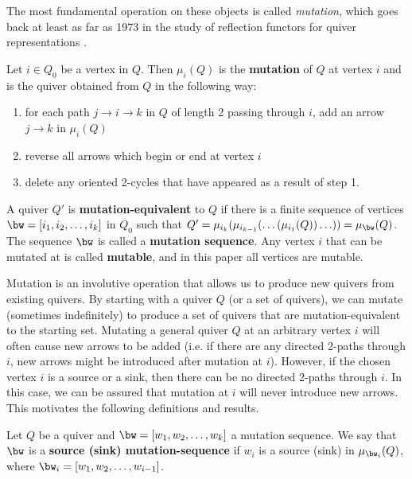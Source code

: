 The most fundamental operation on these objects is called \textit{mutation}, which goes back at least as far as 1973 in the study of reflection functors for quiver representations \cite{MR0393065}.

\begin{defi}\label{def-mutation}
    Let $i \in Q_0$ be a vertex in $Q$. 
    Then $\mu_i (Q)$ is the \textbf{mutation} of $Q$ at vertex $i$ and is the quiver obtained from $Q$ in the following way:
    \begin{enumerate}
        \item for each path $j \to i \to k$ in $Q$ of length 2 passing through $i$, add an arrow $j \to k$ in $\mu_i (Q)$
        \item reverse all arrows which begin or end at vertex $i$
        \item delete any oriented 2-cycles that have appeared as a result of step 1.
    \end{enumerate}
    A quiver $Q'$ is \textbf{mutation-equivalent} to $Q$ if there is a finite sequence of vertices $\bw = [i_1, i_2, \ldots, i_k]$ in $Q_0$ such that $Q' = \mu_{i_k}(\mu_{i_{k-1}}(\ldots(\mu_{i_1}(Q))\ldots)) = \mu_\bw(Q)$.
    The sequence $\bw$ is called a \textbf{mutation sequence}.
    Any vertex $i$ that can be mutated at is called \textbf{mutable}, and in this paper all vertices are mutable.
\end{defi}

Mutation is an involutive operation that allows us to produce new quivers from existing quivers.
By starting with a quiver $Q$ (or a set of quivers), we can mutate (sometimes indefinitely) to produce a set of quivers that are mutation-equivalent to the starting set.
Mutating a general quiver $Q$ at an arbitrary vertex $i$ will often cause new arrows to be added (i.e. if there are any directed 2-paths through $i$, new arrows might be introduced after mutation at $i$).
However, if the chosen vertex $i$ is a source or a sink, then there can be no directed 2-paths through $i$.
In this case, we can be assured that mutation at $i$ will never introduce new arrows.
This motivates the following definitions and results.

\begin{defi} \label{def-source-sink-mutation}
    Let $Q$ be a quiver and $\bw = [w_1, w_2, \dots, w_k]$ a mutation sequence.
    We say that $\bw$ is a \textbf{source (sink) mutation-sequence} if $w_i$ is a source (sink) in $\mu_{\bw_i}(Q)$, where $\bw_i = [w_1, w_2, \dots, w_{i-1}]$.
\end{defi}

